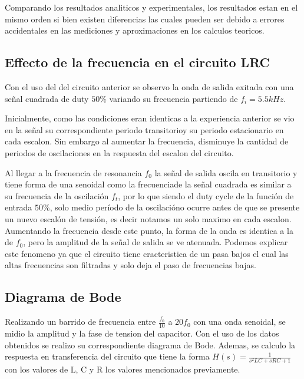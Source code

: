 Comparando los resultados analiticos y experimentales, los resultados estan en el mismo orden si bien existen diferencias las cuales pueden ser debido a errores accidentales en las mediciones y aproximaciones en los calculos teoricos. 

\subsection{Effecto de la frecuencia en el circuito LRC}

Con el uso del del circuito anterior se observo la onda de salida exitada con una señal cuadrada de duty $50\%$ variando su frecuencia partiendo de $f_i=5.5kHz$.

Inicialmente, como las condiciones eran identicas a la experiencia anterior se vio en la señal su correspondiente periodo transitorioy su periodo estacionario en cada escalon. Sin embargo al aumentar la frecuencia, disminuye la cantidad de periodos de oscilaciones en la respuesta del escalon del circuito. 

Al llegar a la frecuencia de resonancia $f_0$ la señal de salida oscila en transitorio y tiene forma de una senoidal como la frecuenciade la señal cuadrada es similar a su frecuencia de la oscilación $f_t$, por lo que siendo el duty cycle de la función de entrada $50\%$, solo medio período de la oscilacióno ocurre antes de que se presente un nuevo escalón de tensión, es decir notamos un solo maximo en cada escalon. Aumentando la frecuencia desde este punto, la forma de la onda es identica a la de $f_0$, pero la amplitud de la señal de salida se ve atenuada. Podemos explicar este fenomeno ya que el circuito tiene cracteristica de un pasa bajos el cual las altas frecuencias son filtradas y solo deja el paso de frecuencias bajas. 

\subsection{Diagrama de Bode}

Realizando un barrido de frecuencia entre $\frac{f_0}{10}$ a $20f_0$ con una onda senoidal, se midio la amplitud y la fase de tension del capacitor. Con el uso de los datos obtenidos se realizo su correspondiente diagrama de Bode. Ademas, se calculo la respuesta en transferencia del circuito que tiene la forma $H(s)=\frac{1}{s^2LC+sRC+1}$ con los valores de L, C y R los valores mencionados previamente.

